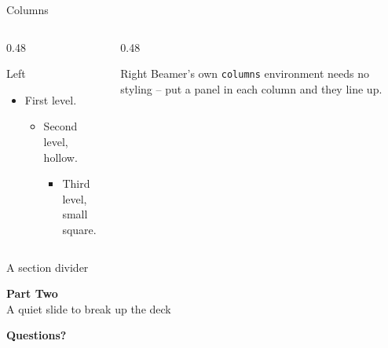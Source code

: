 \begin{frame}{Columns}
    \begin{columns}[T]
        \begin{column}{0.48\textwidth}
            \begin{panel}{Left}
                \begin{itemize}
                    \item First level.
                    \begin{itemize}
                        \item Second level, hollow.
                        \begin{itemize}
                            \item Third level, small square.
                        \end{itemize}
                    \end{itemize}
                \end{itemize}
            \end{panel}
        \end{column}
        \begin{column}{0.48\textwidth}
            \begin{panel}{Right}
                Beamer's own \texttt{columns} environment needs no styling --
                put a panel in each column and they line up.
            \end{panel}
        \end{column}
    \end{columns}
\end{frame}

\begin{frame}{A section divider}
    \vfill
    \begin{center}
        {\titlefont \Huge \bfseries \color{ink} Part Two}\\[0.3cm]
        {\color{gray} A quiet slide to break up the deck}
    \end{center}
    \vfill
\end{frame}

\begin{frame}[plain]
    \vfill
    \begin{center}
        {\titlefont \Huge \bfseries \color{accent} Questions?}
    \end{center}
    \vfill
\end{frame}
